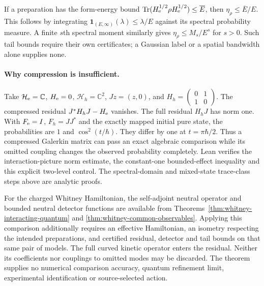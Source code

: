 If a preparation has the form-energy bound
$\operatorname{Tr}(H_{\rm e}^{1/2}\rho H_{\rm e}^{1/2})\leq\overline E$,
then $\eta_\rho\leq\overline E/E$. This follows by integrating
$\mathbf1_{(E,\infty)}(\lambda)\leq\lambda/E$ against its spectral
probability measure. A finite $s$th spectral moment similarly gives
$\eta_\rho\leq M_s/E^s$ for $s>0$. Such tail bounds require their own
certificates; a Gaussian label or a spatial bandwidth alone supplies none.

\paragraph{Why compression is insufficient.}
Take $\mathcal H_{\rm e}=\mathbb C$, $H_{\rm e}=0$,
$\mathcal H_h=\mathbb C^2$, $Jz=(z,0)$, and
$H_h=\left(\begin{smallmatrix}0&1\\1&0\end{smallmatrix}\right)$.
The compressed residual $J^*H_hJ-H_{\rm e}$ vanishes. The full residual
$H_hJ$ has norm one. With $F_{\rm e}=I$, $F_h=JJ^*$ and the exactly
mapped initial pure state, the probabilities are $1$ and
$\cos^2(t/\hbar)$. They differ by one at $t=\pi\hbar/2$.
Thus a compressed Galerkin matrix can pass an exact algebraic comparison
while its omitted coupling changes the observed probability completely.
Lean verifies the interaction-picture norm estimate, the constant-one
bounded-effect inequality and this explicit two-level control. The
spectral-domain and mixed-state trace-class steps above are analytic proofs.

For the charged Whitney Hamiltonian, the self-adjoint neutral operator and
bounded neutral detector functions are available from
Theorems~\ref{thm:whitney-interacting-quantum} and
\ref{thm:whitney-common-observables}. Applying this comparison additionally
requires an effective Hamiltonian, an isometry respecting the intended
preparations, and certified residual, detector and tail bounds on that same
pair of models. The full curved kinetic operator enters the residual.
Neither its coefficients nor couplings to omitted modes may be discarded.
The theorem supplies no numerical comparison accuracy, quantum refinement
limit, experimental identification or source-selected action.
